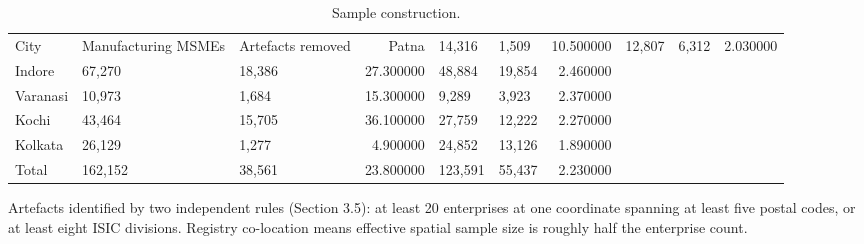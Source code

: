 \begin{table}[htbp]
\centering
\small
\caption{Sample construction.}
\label{tab:t2_sample}
\begin{tabular}{lllrllr}
\toprule
City & Manufacturing MSMEs & Artefacts removed & %
\midrule
Patna & 14,316 & 1,509 & 10.500000 & 12,807 & 6,312 & 2.030000 \\
Indore & 67,270 & 18,386 & 27.300000 & 48,884 & 19,854 & 2.460000 \\
Varanasi & 10,973 & 1,684 & 15.300000 & 9,289 & 3,923 & 2.370000 \\
Kochi & 43,464 & 15,705 & 36.100000 & 27,759 & 12,222 & 2.270000 \\
Kolkata & 26,129 & 1,277 & 4.900000 & 24,852 & 13,126 & 1.890000 \\
Total & 162,152 & 38,561 & 23.800000 & 123,591 & 55,437 & 2.230000 \\
\bottomrule
\end{tabular}
\begin{tablenotes}\footnotesize
\item Artefacts identified by two independent rules (Section 3.5): at least 20 enterprises at one coordinate spanning at least five postal codes, or at least eight ISIC divisions. Registry co-location means effective spatial sample size is roughly half the enterprise count.
\end{tablenotes}
\end{table}
